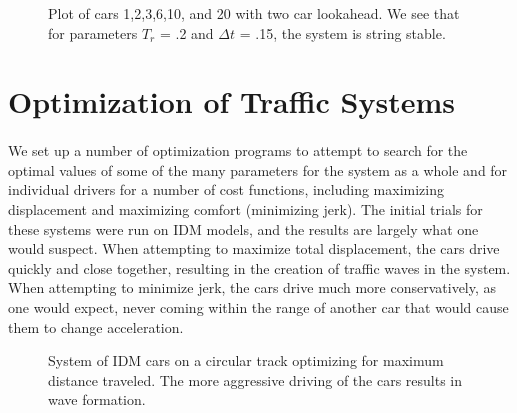\documentclass[12pt]{article}
\begin{document}
\begin{figure}[H]
  \centering
  \caption{Plot of cars 1,2,3,6,10, and 20 with two car lookahead. We see that for parameters $T_r$ = .2 and $\Delta t$ = .15, the system is string stable.}
\end{figure}

\section{Optimization of Traffic Systems}
\paragraph{}We set up a number of optimization programs to attempt to search for the optimal values of some of the many parameters for the system as a whole and for individual drivers for a number of cost functions, including maximizing displacement and maximizing comfort (minimizing jerk). The initial trials for these systems were run on IDM models, and the results are largely what one would suspect. When attempting to maximize total displacement, the cars drive quickly and close together, resulting in the creation of traffic waves in the system. When attempting to minimize jerk, the cars drive much more conservatively, as one would expect, never coming within the range of another car that would cause them to change acceleration. \\

\begin{figure}[H]
  \centering
  \caption{System of IDM cars on a circular track optimizing for maximum distance traveled. The more aggressive driving of the cars results in wave formation.}
\end{figure}
\end{document}
